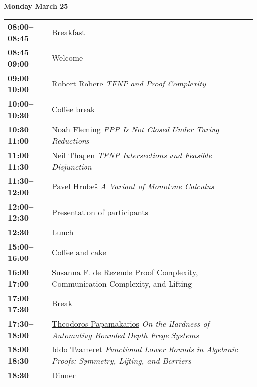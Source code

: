 \documentclass[11pt]{article}
\newcommand{\scheduletablewidth}{5.06in}
\begin{document}
\noindent\begin{minipage}{\textwidth}
\begin{center}
{\bf\large Monday March 25}
\end{center}
\begin{tabular}{ p{0.9in} p{\scheduletablewidth} }
{\bf 08:00--08:45}  & Breakfast\\
{\bf 08:45--09:00}  &
                    Welcome
\\

{\bf 09:00--10:00} & \hyperref[Robere]{Robert Robere}
{\em TFNP and Proof Complexity} \\

{\bf 10:00--10:30} & {Coffee break} \\

{\bf 10:30--11:00} & \hyperref[Fleming]{Noah Fleming}
{\em PPP Is Not Closed Under Turing Reductions} \\

{\bf 11:00--11:30} & \hyperref[Thapen1]{Neil Thapen}
{\em TFNP Intersections and Feasible Disjunction} \\

{\bf 11:30--12:00} & \hyperref[Hrubes]{Pavel Hrube\v{s}}
{\em A Variant of Monotone Calculus} \\

{\bf 12:00--12:30} & Presentation of participants \\

{\bf 12:30%
} &  Lunch\\

{\bf 15:00--16:00} &  Coffee and cake \\

{\bf 16:00--17:00} & \hyperref[Rezende]{Susanna F. de Rezende}
                     {Proof Complexity, Communication Complexity, and Lifting                     
                     } \\

{\bf 17:00--17:30} & {Break} \\

{\bf 17:30--18:00} & \hyperref[Papamakarios]{Theodoros Papamakarios}
{\em On the Hardness of Automating Bounded Depth Frege Systems} \\

{\bf 18:00--18:30} & \hyperref[Tzameret]{Iddo Tzameret}
{\em Functional Lower Bounds in Algebraic Proofs: Symmetry, Lifting, and Barriers} \\

{\bf 18:30%
} & Dinner \\
\end{tabular}
\end{minipage}
\end{document}
